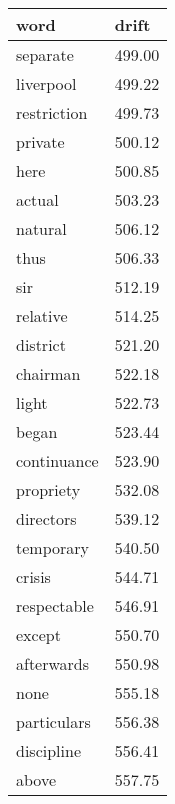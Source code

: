 \documentclass{article}
\begin{document}
\begin{longtable}[c]{ll}
word                                 & drift       \\
\endhead
%
\multicolumn{1}{l|}{separate}        & 499.00  \\ \hline
\multicolumn{1}{l|}{liverpool}       & 499.22  \\ \hline
\multicolumn{1}{l|}{restriction}     & 499.73  \\ \hline
\multicolumn{1}{l|}{private}         & 500.12  \\ \hline
\multicolumn{1}{l|}{here}            & 500.85  \\ \hline
\multicolumn{1}{l|}{actual}          & 503.23  \\ \hline
\multicolumn{1}{l|}{natural}         & 506.12  \\ \hline
\multicolumn{1}{l|}{thus}            & 506.33  \\ \hline
\multicolumn{1}{l|}{sir}             & 512.19  \\ \hline
\multicolumn{1}{l|}{relative}        & 514.25  \\ \hline
\multicolumn{1}{l|}{district}        & 521.20  \\ \hline
\multicolumn{1}{l|}{chairman}        & 522.18  \\ \hline
\multicolumn{1}{l|}{light}           & 522.73  \\ \hline
\multicolumn{1}{l|}{began}           & 523.44  \\ \hline
\multicolumn{1}{l|}{continuance}     & 523.90  \\ \hline
\multicolumn{1}{l|}{propriety}       & 532.08  \\ \hline
\multicolumn{1}{l|}{directors}       & 539.12  \\ \hline
\multicolumn{1}{l|}{temporary}       & 540.50  \\ \hline
\multicolumn{1}{l|}{crisis}          & 544.71  \\ \hline
\multicolumn{1}{l|}{respectable}     & 546.91  \\ \hline
\multicolumn{1}{l|}{except}          & 550.70  \\ \hline
\multicolumn{1}{l|}{afterwards}      & 550.98  \\ \hline
\multicolumn{1}{l|}{none}            & 555.18  \\ \hline
\multicolumn{1}{l|}{particulars}     & 556.38  \\ \hline
\multicolumn{1}{l|}{discipline}      & 556.41  \\ \hline
\multicolumn{1}{l|}{above}           & 557.75  \\ \hline

\end{longtable}
\end{document}
